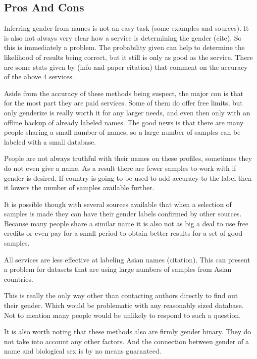 \documentclass{article}
\begin{document}
\subsection{Pros And Cons}
Inferring gender from names is not an easy task (some examples and sources). It is also not always very clear how a service is determining the gender (cite). So this is immediately a problem. The probability given can help to determine the likelihood of results being correct, but it still is only as good as the service. There are some stats given by (info and paper citation) that comment on the accuracy of the above 4 services.

Aside from the accuracy of these methods being suspect, the major con is that for the most part they are paid services. Some of them do offer free limits, but only genderize is really worth it for any larger needs, and even then only with an offline backup of already labeled names. The good news is that there are many people sharing a small number of names, so a large number of samples can be labeled with a small database.

People are not always truthful with their names on these profiles, sometimes they do not even give a name. As a result there are fewer samples to work with if gender is desired. If country is going to be used to add accuracy to the label then it lowers the number of samples available further.

It is possible though with several sources available that when a selection of samples is made they can have their gender labels confirmed by other sources. Because many people share a similar name it is also not as big a deal to use free credits or even pay for a small period to obtain better results for a set of good samples.

All services are less effective at labeling Asian names (citation). This can present a problem for datasets that are using large numbers of samples from Asian countries.

This is really the only way other than contacting authors directly to find out their gender. Which would be problematic with any reasonably sized database. Not to mention many people would be unlikely to respond to such a question.

It is also worth noting that these methods also are firmly gender binary. They do not take into account any other factors. And the connection between gender of a name and biological sex is by no means guaranteed.
\end{document}
